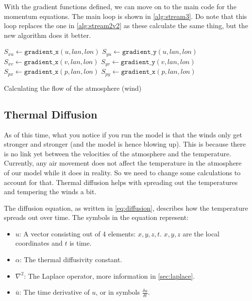With the gradient functions defined, we can move on to the main code for the momentum equations. The main loop is shown in \autoref{alg:stream3}. Do note that this loop replaces the one
in \autoref{alg:stream2v2} as these calculate the same thing, but the new algorithm does it better.

\begin{algorithm}
    $S_{xu} \leftarrow \texttt{gradient\_x}(u, lan, lon)$ \;
    $S_{yu} \leftarrow \texttt{gradient\_y}(u, lan, lon)$ \;
    $S_{xv} \leftarrow \texttt{gradient\_x}(v, lan, lon)$ \;
    $S_{yv} \leftarrow \texttt{gradient\_y}(v, lan, lon)$ \;
    $S_{px} \leftarrow \texttt{gradient\_x}(p, lan, lon)$ \;
    $S_{py} \leftarrow \texttt{gradient\_x}(p, lan, lon)$ \;
    \caption{Calculating the flow of the atmosphere (wind)}
    \label{alg:stream3}
\end{algorithm}

\subsection{Thermal Diffusion}
As of this time, what you notice if you run the model is that the winds only get stronger and stronger (and the model is hence blowing up). This is because there is no link yet between the 
velocities of the atmosphere and the temperature. Currently, any air movement does not affect the temperature in the atmosphere of our model while it does in reality. So we need to change some 
calculations to account for that. Thermal diffusion helps with spreading out the temperatures and tempering the winds a bit.

The diffusion equation, as written in \autoref{eq:diffusion}, describes how the temperature spreads out over time\cite{diffusion}. The symbols in the equation represent:

\begin{itemize}
    \item $u$: A vector consisting out of 4 elements: $x, y, z, t$. $x, y, z$ are the local coordinates and $t$ is time.
    \item $\alpha$: The thermal diffusivity constant.
    \item $\nabla^2$: The Laplace operator, more information in \autoref{sec:laplace}.
    \item $\bar{u}$: The time derivative of $u$, or in symbols $\frac{\delta u}{\delta t}$.
\end{itemize}

